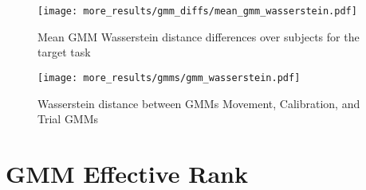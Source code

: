 \documentclass[../main.tex]{subfiles}
\begin{document}
\begin{figure}[H]%
  \centering
    \texttt{[image: more\_results/gmm\_diffs/mean\_gmm\_wasserstein.pdf]}
    \caption[Mean GMM Wasserstein distance differences over subjects]{Mean GMM Wasserstein distance differences over subjects for the target task}\label{fig:gmm_w2_diffs}
\end{figure}

\begin{figure}[H]%
  \centering
    \texttt{[image: more\_results/gmms/gmm\_wasserstein.pdf]}
    \caption[Wasserstein distance between Movement, Calibration, and Trial GMMs]{Wasserstein distance between GMMs Movement, Calibration, and Trial GMMs}\label{fig:gmm_w2}
\end{figure}


\section{GMM Effective Rank}
\end{document}
